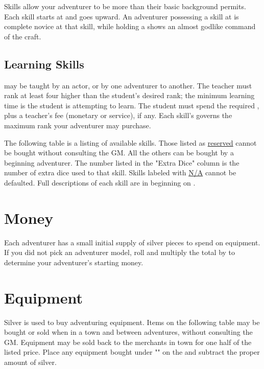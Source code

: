 \begin{multicols*}{2}
Skills allow your adventurer to be more than their basic background permits. Each skill starts at  and goes upward. An adventurer possessing a skill at  is complete novice at that skill, while holding a  shows an almost godlike command of the craft.

\subsection{Learning Skills}
 may be taught by an actor, or by one adventurer to another. The teacher must rank at least four higher than the student's desired rank; the minimum learning time is  the student is attempting to learn. The student must spend the required \EP, plus a teacher's fee (monetary or service), if any. Each skill's  governs the maximum rank your adventurer may purchase.\\

The following table is a listing of available skills. Those listed as \ul{reserved} cannot be bought without consulting the GM. All the others can be bought by a beginning adventurer. The number listed in the "Extra Dice" column is the number of extra dice used to  that skill. Skills labeled with \ul{N/A} cannot be defaulted. Full descriptions of each skill are in  beginning on .
\vfill\null
\label{create-skills}
\begin{tcbraster}[raster columns=1,boxrule=0pt,title=\textbf{Skills},left=0pt,right=0pt,top=0pt,bottom=0pt,boxsep=0pt,boxrule=0.6pt,lefttitle=2.5mm,toptitle=1mm,bottomtitle=1mm,colbacktitle=Navy,colback=white]
\end{tcbraster}
\section{Money}
Each adventurer has a small initial supply of silver pieces to spend on equipment. If you did not pick an adventurer model, roll  and multiply the total by  to determine your adventurer's starting money.
\section{Equipment}
Silver is used to buy adventuring equipment. Items on the following table may be bought or sold when in a town and between adventures, without consulting the GM. Equipment may be sold back to the merchants in town for one half of the listed price. Place any equipment bought under "" on the  and subtract the proper amount of silver.


\end{multicols*}
